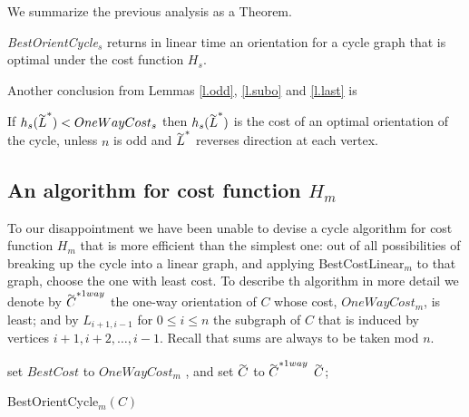 We summarize the previous analysis as a Theorem.
\begin{theorem}\label{t.cycle-s}
	\emph{BestOrientCycle}$_s$  returns  in linear time an orientation for a cycle graph that is optimal under the cost function $H_s$.
\end{theorem}

Another conclusion from Lemmas \ref{l.odd}, \ref{l.subo} and \ref{l.last} is
\begin{corollary}
	If $h_s(\tildeb{L}^*) < OneWayCost_s$ then $h_s(\tildeb{L}^*)$ is the cost of an optimal orientation of the cycle, unless $n$ is odd and $\tildeb{L}^*$ reverses direction at each vertex.
\end{corollary}

\subsection{An algorithm for cost function $H_m$}\label{s.c}

To our disappointment we have been unable to devise a cycle algorithm for cost function $H_m$ that 
is more efficient than the simplest one: 
out of all possibilities of breaking up the cycle into a linear graph, and applying 
BestCostLinear$_m$ to that graph, choose the one with least cost. 
To describe th algorithm in more detail 
we denote by $\tildeb{C}^{*1way}$ the one-way orientation of $C$
whose cost, ${OneWayCost_m}$, is least; and by $L_{i+1,i-1}$ for $0\leq i \leq n$ 
the subgraph of $C$
that is induced by vertices $i+1,i+2,\ldots, i-1$. Recall that sums are 
always to be taken mod $n$.
\begin{algorithm}
set $BestCost$ to $OneWayCost_m$
, and set $ \tildeb{C}$ to $\tildeb{C}^{*1way}$
\;
	\label{ac.i1} 
	\Return $\tildeb{C}$; 
	\caption{BestOrientCycle$_m(C)$}
	\label{algo:oc-m}
\end{algorithm}

